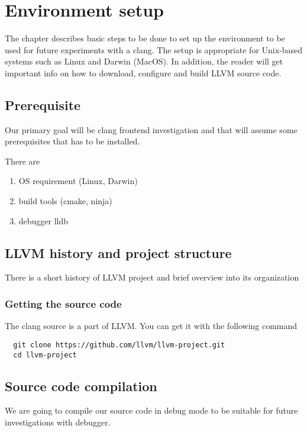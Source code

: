 \chapter{Environment setup}
The chapter describes basic steps to be done to set up the environment to be
used for future experiments with a clang. The setup is appropriate for
Unix-based systems such as Linux and Darwin (MacOS). In addition, the reader
will get important info on how to download, configure and build LLVM source
code.  


\section{Prerequisite}
Our primary goal will be clang frontend investigation and that will assume some
prerequisites that has to be installed.

There are
\begin{enumerate}
\item OS requirement (Linux, Darwin)
\item build tools (cmake, ninja)
\item debugger lldb
\end{enumerate}

\section{LLVM history and project structure}

There is a short history of LLVM project and brief overview into its
organization 

\subsection{Getting the source code}

The clang source is a part of LLVM. You can get it with the following
command
\begin{verbatim}
  git clone https://github.com/llvm/llvm-project.git
  cd llvm-project
\end{verbatim}

\section{Source code compilation}

We are going to compile our source code in debug mode to be suitable
for future investigations with debugger.

